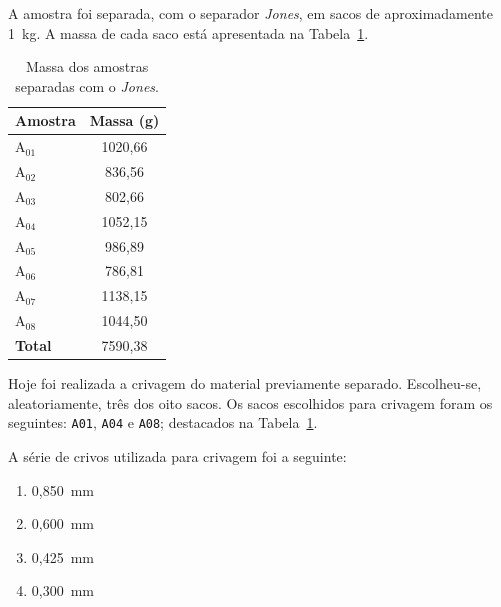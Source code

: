 A amostra foi separada, com o separador \textit{Jones}, em sacos de aproximadamente 1~kg.
A massa de cada saco está apresentada na Tabela~\ref{tab:massa_sacos}.

\begin{table}[!htbp]
    \centering
    \begin{tabular}{@{}lc@{}}
        \toprule
        \textbf{Amostra} & \textbf{Massa (g)} \\ \midrule
        \textcolor{customblue}{A$_{01}$} & \textcolor{customblue}{1020,66} \\
        A$_{02}$ & 836,56 \\
        A$_{03}$ & 802,66 \\
        \textcolor{customorange}{A$_{04}$} & \textcolor{customorange}{1052,15} \\
        A$_{05}$ & 986,89 \\
        A$_{06}$ & 786,81 \\
        A$_{07}$ & 1138,15 \\
        \textcolor{customgreen}{A$_{08}$} & \textcolor{customgreen}{1044,50} \\ \midrule
        \textbf{Total} & 7590,38 \\ \bottomrule
    \end{tabular}
    \caption{Massa dos amostras separadas com o \emph{Jones}.}
    \label{tab:massa_sacos}
\end{table}


\hrulefill

\pagebreak


Hoje foi realizada a crivagem do material previamente separado.
Escolheu-se, aleatoriamente, três dos oito sacos.
Os sacos escolhidos para crivagem foram os seguintes: \texttt{A01}, \texttt{A04} e \texttt{A08}; destacados na Tabela~\ref{tab:massa_sacos}.

A série de crivos utilizada para crivagem foi a seguinte:

\begin{minipage}{0.4\textwidth}
    \begin{enumerate}
        \item 0,850~mm
        \item 0,600~mm
    \end{enumerate}
\end{minipage}
\begin{minipage}{0.4\textwidth}
    \begin{enumerate}
        \setcounter{enumi}{2}
        \item 0,425~mm
        \item 0,300~mm
    \end{enumerate}
\end{minipage}

